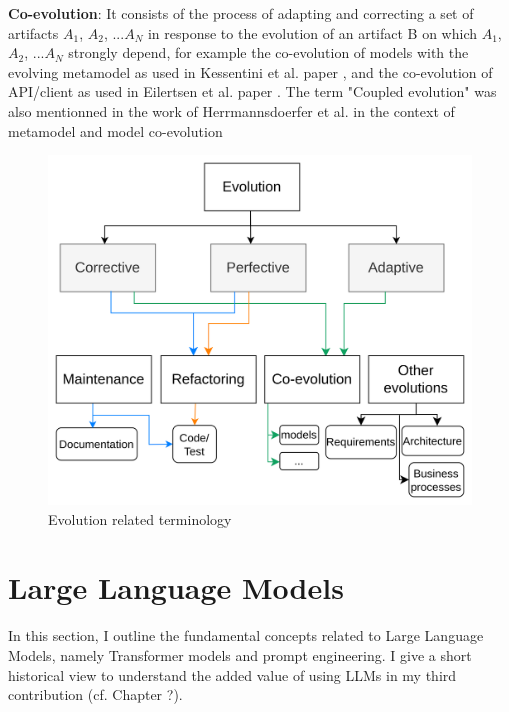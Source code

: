 \textbf{Co-evolution}: It consists of the process of adapting and correcting a set of artifacts $A_1$, $A_2$, ...$A_N$ in response to the evolution of an artifact B on which $A_1$, $A_2$, ...$A_N$  strongly depend, for example the co-evolution of models with the evolving metamodel as used in Kessentini et al. paper \cite{Kessentini2016automated}, and the co-evolution of API/client as used in Eilertsen et al. paper \cite{8443581}. The term "Coupled evolution" was also mentionned in the work of Herrmannsdoerfer et al. in the context of metamodel and model co-evolution \cite{herrmannsdoerfer2009cope}




\begin{figure}[t]
	\begin{center}
		\includegraphics[width=0.6\linewidth]{./pics/soaPics/evolutiontypes.png}
	\end{center}
	\caption{Evolution related terminology}
	\label{fig:evolutiontypes}
\end{figure}

\section{Large Language Models}
In this section, I outline the fundamental concepts related to Large Language Models, namely Transformer models and prompt engineering. I give a short historical view to understand the added value of using LLMs in my third contribution (cf. Chapter ?).

